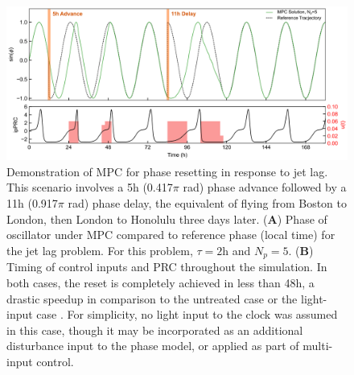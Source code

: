 \clearpage
\begin{figure}[p]
    \begin{center}
    \includegraphics[width=\textwidth]{chap6/figures/figure_7.png}
\end{center}
      \caption{\label{fig:mpc_demo}
      Demonstration of MPC for phase resetting in response to jet lag. This scenario involves a 5h (0.417$\pi$ rad) phase advance followed by a 11h (0.917$\pi$ rad) phase delay, the equivalent of flying from Boston to London, then London to Honolulu three days later. (\textbf{A}) Phase of oscillator under MPC compared to reference phase (local time) for the jet lag problem. For this problem, $\tau=2$h and $N_p=5$. (\textbf{B}) Timing of control inputs and PRC throughout the simulation. In both cases, the reset is completely achieved in less than 48h, a drastic speedup in comparison to the untreated case or the light-input case \cite{Qiao2017}. For simplicity, no light input to the clock was assumed in this case, though it may be incorporated as an additional disturbance input to the phase model, or applied as part of multi-input control.
  }
\end{figure}


